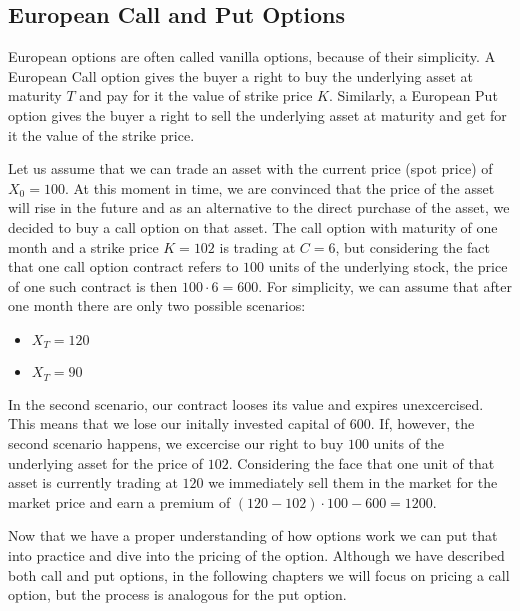 \documentclass[times, utf8, diplomski]{fer}
\begin{document}
\subsection{European Call and Put Options}
European options are often called vanilla options, because of their simplicity. A European Call option gives the buyer a right to buy the underlying asset at maturity $T$ and pay for it the value of strike price $K$. Similarly, a European Put option gives the buyer a right to sell the underlying asset at maturity and get for it the value of the strike price. 

\hfill \break
Let us assume that we can trade an asset with the current price (spot price) of $X_0 = 100$. At this moment in time, we are convinced that the price of the asset will rise in the future and as an alternative to the direct purchase of the asset, we decided to buy a call option on that asset. The call option with maturity of one month and a strike price $K=102$ is trading at $C=6$, but considering the fact that one call option contract refers to $100$ units of the underlying stock, the price of one such contract is then $100 \cdot 6 = 600$. For simplicity, we can assume that after one month there are only two possible scenarios:
\begin{itemize}
	\item $X_T = 120$
	\item $X_T = 90$
\end{itemize} In the second scenario, our contract looses its value and expires unexcercised. This means that we lose our initally invested capital of $600$. If, however, the second scenario happens, we excercise our right to buy $100$ units of the underlying asset for the price of $102$. Considering the face that one unit of that asset is currently trading at $120$ we immediately sell them in the market for the market price and earn a premium of $(120 - 102)\cdot 100 - 600 = 1200$.

\noindent Now that we have a proper understanding of how options work we can put that into practice and dive into the pricing of the option. Although we have described both call and put options, in the following chapters we will focus on pricing a call option, but the process is analogous for the put option. 
\end{document}
